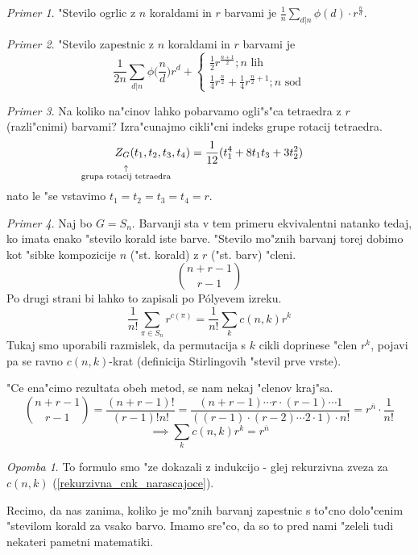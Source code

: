 \documentclass[a4paper,12pt]{article}
\theoremstyle{definition}
\theoremstyle{remark}
\newtheorem*{ex}{Primer}
\newtheorem*{rem}{Opomba}
\begin{document}
\begin{ex}
	"Stevilo ogrlic z $n$ koraldami in $r$ barvami je $\frac{1}{n}\sum_{d|n}\phi(d)\cdot r^{\frac{n}{d}}$.
\end{ex}
\begin{ex}
	"Stevilo zapestnic z $n$ koraldami in $r$ barvami je
	\[ \frac{1}{2n} \sum_{d | n} \phi\big(\frac{n}{d}\big) r^d + \begin{cases}\frac{1}{2} r^{\frac{n+1}{2}}; n\text{ lih}\\ \frac{1}{4} r^{\frac{n}{2}} + \frac{1}{4}r^{\frac{n}{2}+1}; n\text{ sod} \end{cases} \]
\end{ex}
\begin{ex}
	Na koliko na"cinov lahko pobarvamo ogli"s"ca tetraedra z $r$ (razli"cnimi) barvami? Izra"cunajmo cikli"cni indeks grupe rotacij tetraedra.
	\[ Z_{\substack{G \\ \\ \uparrow \\ \mathclap{\text{grupa rotacij tetraedra}}}} (t_1,t_2,t_3,t_4) = \frac{1}{12}(t_1^4 + 8t_1t_3 + 3t_2^2) \]
	nato le "se vstavimo $t_1 = t_2 = t_3 = t_4 = r$.
\end{ex}
\begin{ex}\label{polyeva_dokaz_rekurzivne_cnk}
	Naj bo $G = S_n$. Barvanji sta v tem primeru ekvivalentni natanko tedaj, ko imata enako "stevilo korald iste barve. "Stevilo mo"znih barvanj torej dobimo kot "sibke kompozicije $n$ ("st. korald) z $r$ ("st. barv) "cleni.
	\[\binom{n+r-1}{r-1} \]
	Po drugi strani bi lahko to zapisali po P\'{o}lyevem izreku.
	\[ \frac{1}{n!}\sum_{\pi \in S_n} r^{c(\pi)} = \frac{1}{n!}\sum_k c(n,k) r^k \]
	Tukaj smo uporabili razmislek, da permutacija s $k$ cikli doprinese "clen $r^k$, pojavi pa se ravno $c(n, k)$-krat (definicija Stirlingovih "stevil prve vrste).
	
	"Ce ena"cimo rezultata obeh metod, se nam nekaj "clenov kraj"sa.
	\[ \binom{n+r-1}{r-1} = \frac{(n+r-1)!}{(r-1)!n!} = \frac{(n+r-1)\cdots r \cdot(r-1)\cdots1}{((r-1)\cdot(r-2)\cdots2\cdot1)\cdot n!} = r^{\overline{n}} \cdot \frac{1}{n!} \]
	\[ \implies \sum_k c(n,k) r^k = r^{\overline{n}} \]
	\begin{rem}
		To formulo smo "ze dokazali z indukcijo - glej rekurzivna zveza za $c(n, k)$ (\ref{rekurzivna_cnk_narascajoce}).
	\end{rem}
\end{ex}



Recimo, da nas zanima, koliko je mo"znih barvanj zapestnic s to"cno dolo"cenim "stevilom korald za vsako barvo. Imamo sre"co, da so to pred nami "zeleli tudi nekateri pametni matematiki.
\end{document}
